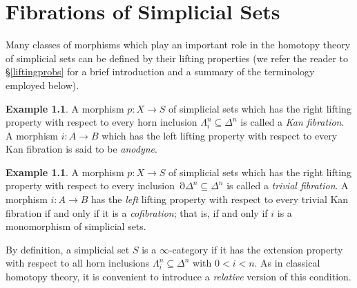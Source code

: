 \documentclass{report}[10pt, final]
\DeclareMathOperator{\bd}{\partial}
\theoremstyle{definition}
\newtheorem{example}[theorem]{Example}
\begin{document}


\chapter{Fibrations of Simplicial Sets}\label{chap2}

\setcounter{theorem}{0}
\setcounter{subsection}{0}


%

 Many classes of morphisms which play an important role in the homotopy theory of simplicial sets can be defined by their lifting properties (we refer the reader to \S \ref{liftingprobs} for a brief introduction and a summary of the terminology employed below). 

\begin{example} 
A morphism $p: X \rightarrow S$ of simplicial sets which has the right
lifting property with respect to every horn inclusion $\Lambda^n_i \subseteq \Delta^n$ is called a {\it Kan fibration}. A morphism $i: A \rightarrow B$ which has the left lifting property with respect to every Kan fibration is said to be {\it anodyne}.
\end{example}

\begin{example}
A morphism $p: X \rightarrow S$ of simplicial sets which has the right
lifting property with respect to every inclusion $\bd \Delta^n \subseteq \Delta^n$ is called a {\it trivial fibration}.
A morphism $i: A \rightarrow B$ has the {\em left} lifting property with respect to every trivial Kan fibration if and only if it is a {\it cofibration}; that is, if and only if $i$ is a monomorphism of simplicial sets.
\end{example}

By definition, a simplicial set $S$ is a $\infty$-category if it has
the extension property with respect to all horn inclusions
$\Lambda^n_i \subseteq \Delta^n$ with $0 < i < n$. As in classical homotopy theory, it is
convenient to introduce a {\em relative} version of this condition.
\end{document}
